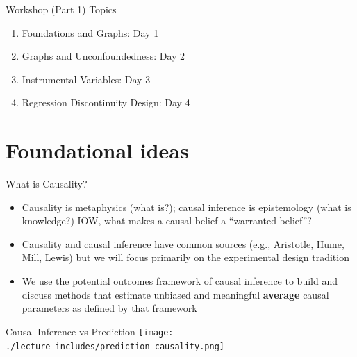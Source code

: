 \documentclass{beamer}
\begin{document}
\begin{frame}{Workshop (Part 1) Topics}

  \begin{enumerate}
    \item Foundations and Graphs: Day 1
    \item Graphs and Unconfoundedness: Day 2
    \item Instrumental Variables: Day 3
    \item Regression Discontinuity Design: Day 4
  \end{enumerate}

\end{frame}









\section{Foundational ideas}


\begin{frame}{What is Causality?}

\begin{itemize}
\item Causality is metaphysics (what is?); causal inference is epistemology (what is knowledge?) IOW, what makes a causal belief a ``warranted belief''?
\item Causality and causal inference have common sources (e.g., Aristotle, Hume, Mill, Lewis) but we will focus primarily on the experimental design tradition
\item We use the potential outcomes framework of causal inference to build and discuss methods that estimate unbiased and meaningful \textbf{average} causal parameters as defined by that framework
\end{itemize}

\end{frame}


\begin{frame}{Causal Inference vs Prediction}
  \centering
  \texttt{[image: ./lecture\_includes/prediction\_causality.png]}
\end{frame}
\end{document}
